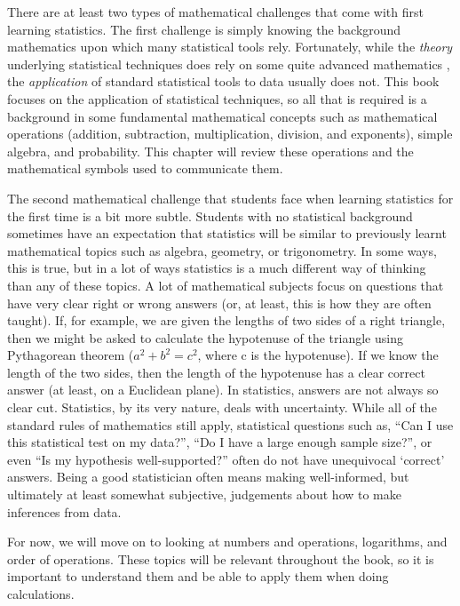 \documentclass[
  openany]{krantz}
\begin{document}
There are at least two types of mathematical challenges that come with first learning statistics.
The first challenge is simply knowing the background mathematics upon which many statistical tools rely.
Fortunately, while the \emph{theory} underlying statistical techniques does rely on some quite advanced mathematics \citep[e.g., see][]{Mclean1991, Rencher2000, Miller2004}, the \emph{application} of standard statistical tools to data usually does not.
This book focuses on the application of statistical techniques, so all that is required is a background in some fundamental mathematical concepts such as mathematical operations (addition, subtraction, multiplication, division, and exponents), simple algebra, and probability.
This chapter will review these operations and the mathematical symbols used to communicate them.

The second mathematical challenge that students face when learning statistics for the first time is a bit more subtle.
Students with no statistical background sometimes have an expectation that statistics will be similar to previously learnt mathematical topics such as algebra, geometry, or trigonometry.
In some ways, this is true, but in a lot of ways statistics is a much different way of thinking than any of these topics.
A lot of mathematical subjects focus on questions that have very clear right or wrong answers (or, at least, this is how they are often taught).
If, for example, we are given the lengths of two sides of a right triangle, then we might be asked to calculate the hypotenuse of the triangle using Pythagorean theorem (\(a^{2} + b^{2} = c^{2}\), where c is the hypotenuse).
If we know the length of the two sides, then the length of the hypotenuse has a clear correct answer (at least, on a Euclidean plane).
In statistics, answers are not always so clear cut.
Statistics, by its very nature, deals with uncertainty.
While all of the standard rules of mathematics still apply, statistical questions such as, ``Can I use this statistical test on my data?'', ``Do I have a large enough sample size?'', or even ``Is my hypothesis well-supported?'' often do not have unequivocal `correct' answers.
Being a good statistician often means making well-informed, but ultimately at least somewhat subjective, judgements about how to make inferences from data.

For now, we will move on to looking at numbers and operations, logarithms, and order of operations.
These topics will be relevant throughout the book, so it is important to understand them and be able to apply them when doing calculations.
\end{document}
